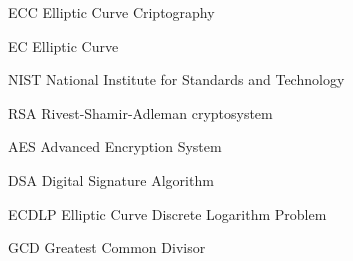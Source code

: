 \begin{siglas}
  \item[ECC] Elliptic Curve Criptography
  \item[EC] Elliptic Curve
  \item[NIST] National Institute for Standards and Technology
  \item[RSA] Rivest-Shamir-Adleman cryptosystem
  \item[AES] Advanced Encryption System
  \item[DSA] Digital Signature Algorithm
  \item[ECDLP] Elliptic Curve Discrete Logarithm Problem
  \item[GCD] Greatest Common Divisor
\end{siglas}
